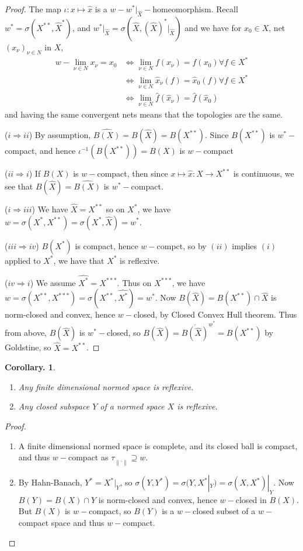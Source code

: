 \documentclass[11pt, a4paper]{memoir}
\newcommand{\imp}[2]{($#1\Rightarrow#2$)\hspace{0.2cm}}
\newcommand{\norm}[1]{\ensuremath{\left\lVert#1\right\rVert}}
\theoremstyle{change}
\newtheorem{corollary}[theorem]{Corollary.}
\theoremstyle{plain}
\theoremstyle{nonumberplain}
\newtheorem{proof}{Proof}
\numberwithin{equation}{section}
\begin{document}
\begin{proof}
    The map $\iota:x\mapsto\hat x$ is a $w-w^*|_{\hat X}-$homeomorphism.
    Recall $w^*=\sigma(X^{**},\hat X^*)$, and $w^*|_{\hat X}=\sigma(\hat X,(\hat X)^*|_{\hat X})$ and we have for $x_0\in X$, net $(x_\nu)_{\nu\in N}$ in $X$,
    \begin{align*}
        w-\lim_{\nu\in N}x_\nu = x_0 &\iff \lim_{\nu\in N}f(x_\nu)=f(x_0)\forall f\in X^*\\
                                     &\iff \lim_{\nu\in N}\hat x_\nu(f)=\hat x_0(f)\forall f\in X^*\\
                                     &\iff \lim_{\nu\in N}\hat f(\hat x_\nu)=\hat f(\hat x_0)
    \end{align*}
    and having the same convergent nets means that the topologies are the same.

    \imp{i}{ii}
    By assumption, $\widehat{B(X)}=B(\hat X)=B(X^{**})$.
    Since $B(X^{**})$ is $w^*-$compact, and hence $\iota^{-1}(B(X^{**}))=B(X)$ is $w-$compact

    \imp{ii}{i}
    If $B(X)$ is $w-$compact, then since $x\mapsto\hat x:X\to X^{**}$ is continuous, we see that $B(\hat X)=\widehat{B(X)}$ is $w^*-$compact.

    \imp{i}{iii}
    We have $\hat X=X^{**}$ so on $X^*$, we have $w=\sigma(X^*,X^{**})=\sigma(X^*,\hat X)=w^*$.

    \imp{iii}{iv}
    $B(X^*)$ is compact, hence $w-$compct, so by $(ii)$ implies $(i)$ applied to $X^*$, we have that $X^*$ is reflexive.

    \imp{iv}{i}
    We assume $\widehat{X^*}=X^{***}$.
    Thus on $X^{***}$, we have $w=\sigma(X^{**},X^{***})=\sigma(X^{**},\widehat{X^*})=w^*$.
    Now $B(\hat X)=B(X^{**})\cap\hat X$ is norm-closed and convex, hence $w-$closed, by Closed Convex Hull theorem.
    Thus from above, $B(\hat X)$ is $w^*-$closed, so $B(\hat X)=\overline{B(\hat X)}^{w^*}=B(X^{**})$ by Goldstine, so $\hat X=X^{**}$.
\end{proof}
\begin{corollary}
    \begin{enumerate}[nl,r]
        \item Any finite dimensional normed space is reflexive.
        \item Any closed subspace $Y$ of a normed space $X$ is reflexive.
    \end{enumerate}
\end{corollary}
\begin{proof}
    \begin{enumerate}[nl,r]
        \item A finite dimensional normed space is complete, and its closed ball is compact, and thus $w-$compact as $\tau_{\norm{\cdot}}\supseteq w$.
        \item By Hahn-Banach, $Y^*=X^*|_Y$, so $\sigma(Y,Y^*)=\sigma(Y,X^*|_Y)=\sigma(X,X^*)|_Y$.
            Now $B(Y)=B(X)\cap Y$ is norm-closed and convex, hence $w-$closed in $B(X)$.
            But $B(X)$ is $w-$compact, so $B(Y)$ is a $w-$closed subset of a $w-$compact space and thus $w-$compact.
    \end{enumerate}
\end{proof}
\end{document}
